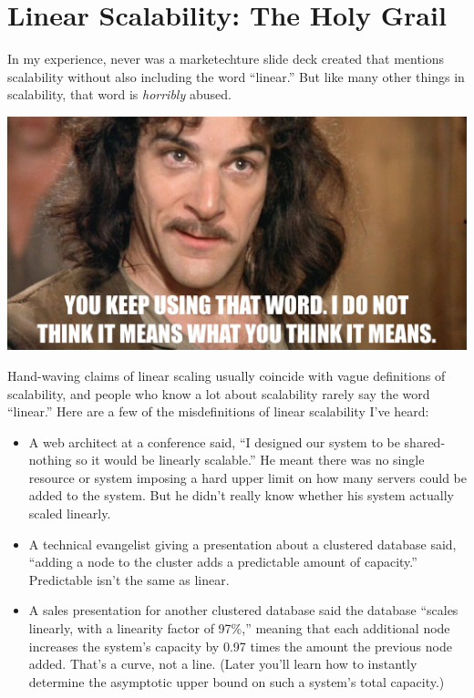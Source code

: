 \documentclass{vivid_layout}
\begin{document}
\section{Linear Scalability: The Holy Grail}

In my experience, never was a marketechture slide deck created that mentions
scalability without also including the word ``linear.'' But like many other things
in scalability, that word is {\itshape horribly} abused.
\begin{center}
\includegraphics[width=.85\linewidth]{scalability/inigo}
\end{center}

Hand-waving claims of linear scaling usually coincide with vague definitions
of scalability, and people who know a lot about scalability rarely say the word
``linear.'' Here are a few of the misdefinitions of linear scalability I've heard:

\begin{itemize}
\item A web architect at a conference said, ``I designed our system to be
shared-nothing so it would be linearly scalable.'' He meant there was no
single resource or system imposing a hard upper limit on how many servers could
be added to the system. But he didn't really know whether his system actually
scaled linearly.
\item A technical evangelist giving a presentation about a clustered database
said, ``adding a node to the cluster adds a predictable amount of capacity.''
Predictable isn't the same as linear.
\item A sales presentation for another clustered database said the database
``scales linearly, with a linearity factor of 97\%,'' meaning that each
additional node increases the system's capacity by 0.97 times the amount the
previous node added. That's a curve, not a line.  (Later you'll learn how to
instantly determine the asymptotic upper bound on such a system's total
capacity.)
\end{itemize}
\end{document}
